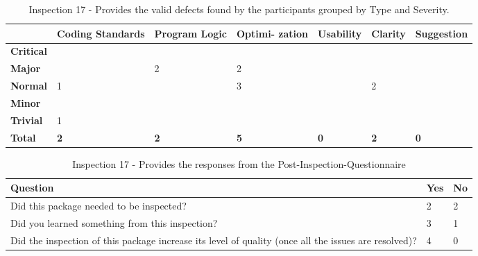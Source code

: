 \begin{table}[!h]
  \begin{center}
    \caption[Inspection 17 - Results by Type and Severity]{Inspection 17 -
      Provides the valid defects found by the participants grouped by Type
      and Severity.}
    \label{tab:inspection-results-17-type}
    \begin{tabular}{|p{2.0cm}|p{1.7cm}|p{1.5cm}|p{1.7cm}|p{1.4cm}|p{1.4cm}|p{1.5cm}|}  \hline   
\small{} & \small{}{\bf Coding Standards} & 
\small{}{\bf Program Logic} & \small{} {\bf Optimi- zation} & 
\small{}{\bf Usability} & \small{} {\bf Clarity} & 
\small{} {\bf Suggestion} \\ \hline

{\bf Critical} &   &   &   &   &   &   \\ \hline
{\bf Major}    &   & 2 & 2 &   &   &   \\ \hline
{\bf Normal}   & 1 &   & 3 &   & 2 &   \\ \hline
{\bf Minor}    &   &   &   &   &   &   \\ \hline
{\bf Trivial}  & 1 &   &   &   &   &   \\ \hline

{\bf Total} & {\bf 2} & {\bf 2} & {\bf 5} & {\bf 0} & {\bf 2} & {\bf 0} \\ \hline
    \end{tabular}
  \end{center}
\end{table}


\begin{table}[!h]
  \begin{center}
    \caption[Post Inspection 17 - Responses]{Inspection 17 - Provides the
      responses from the Post-Inspection-Questionnaire}
    \label{tab:post-inspection-questionnaire-results-17}
    \begin{tabular}{|p{8.0cm}|p{2.5cm}|p{2.5cm}|} \hline
{\bf Question} & {\bf Yes} & {\bf No} \\ \hline
Did this package needed to be inspected?  & 2 & 2 \\ \hline
Did you learned something from this inspection?  & 3 & 1 \\ \hline
Did the inspection of this package increase its level of quality (once all
the issues are resolved)? & 4 & 0 \\ \hline
    \end{tabular}
  \end{center}
\end{table}


